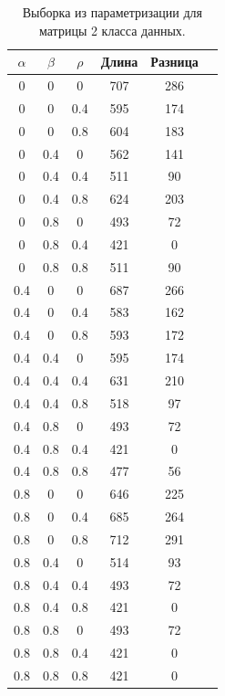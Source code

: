 \documentclass[12pt]{report}
\begin{document}
\begin{table}[H]

	\caption{Выборка из параметризации для матрицы 2 класса данных.}
	\label{tab:v2}
	\begin{center}

		\begin{tabular}{|c@{\hspace{7mm}}|c@{\hspace{7mm}}|c@{\hspace{7mm}}|c@{\hspace{7mm}}|c@{\hspace{7mm}}|c|}

			\hline
			$\alpha$        & $\beta$      & $\rho$      &Длина  & Разница \\

			\hline

0&0&0&707&286\\
0&0&0.4&595&174\\
0&0&0.8&604&183\\
0&0.4&0&562&141\\
0&0.4&0.4&511&90\\
0&0.4&0.8&624&203\\
0&0.8&0&493&72\\
0&0.8&0.4&421&0\\
0&0.8&0.8&511&90\\
\hline
0.4&0&0&687&266\\
0.4&0&0.4&583&162\\
0.4&0&0.8&593&172\\
0.4&0.4&0&595&174\\
0.4&0.4&0.4&631&210\\
0.4&0.4&0.8&518&97\\
0.4&0.8&0&493&72\\
0.4&0.8&0.4&421&0\\
0.4&0.8&0.8&477&56\\
\hline
0.8&0&0&646&225\\
0.8&0&0.4&685&264\\
0.8&0&0.8&712&291\\
0.8&0.4&0&514&93\\
0.8&0.4&0.4&493&72\\
0.8&0.4&0.8&421&0\\
0.8&0.8&0&493&72\\
0.8&0.8&0.4&421&0\\
0.8&0.8&0.8&421&0\\
\hline

		\end{tabular}
	\end{center}
\end{table}
\end{document}
